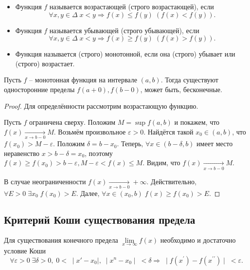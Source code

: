 \begin{itemize}
\item Функция $f$ называется возрастающей (строго возрастающей), если
$$\forall x, y \in \Delta \; x < y \Rightarrow f(x) \leq f(y) \; \left(f(x) < f(y)\right).$$
\item Функция $f$ называется убывающей (строго убывающей), если
$$\forall x, y \in \Delta \; x < y \Rightarrow f(x) \geq f(y) \; \left(f(x) > f(y)\right).$$
\item Функция называется (строго) монотонной, если она (строго) убывает или (строго) возрастает.
\end{itemize}
\begin{Theorem}
Пусть $f$ -- монотонная функция на интервале $(a, b)$.
Тогда существуют односторонние пределы $f(a+0), f(b-0)$, может быть, бесконечные.
\end{Theorem}
\begin{proof}
Для определённости рассмотрим возрастающую функцию.

Пусть $f$ ограничена сверху. Положим $M = \sup f(a, b)$ и покажем, что $f(x) \xrightarrow[x \rightarrow b-0]{} M$. Возьмём произвольное $\varepsilon > 0$. Найдётся такой $x_0 \in (a, b)$, что $f(x_0) > M - \varepsilon$.
Положим $\delta = b - x_0$. Теперь, $\forall x \in (b - \delta, b)$ имеет место неравенство $x > b - \delta = x_0$, поэтому $f(x) \geq f(x_0) > b - \varepsilon, M - \varepsilon < f(x) \leq M$. Видим, что $f(x) \xrightarrow[x \rightarrow b - 0]{} M$.

В случае неограниченности $f(x) \xrightarrow[x \rightarrow b - 0]{} +\infty$.
Действительно, $\forall E > 0 \; \exists x_0 \; f(x_0) > E$. Далее, $\forall x \in (x_0, b) \; f(x) \geq f(x_0) > E$.
\end{proof}

\subsection{Критерий Коши существования предела}
\begin{Theorem}
Для существования конечного предела $\lim\limits_{x \to \infty} f(x)$ необходимо и достаточно условие Коши
$$\forall \varepsilon > 0 \; \exists \delta > 0, \; 0 < \; \mid x' - x_0 \mid, \; \mid x^n - x_0 \mid \; < \delta \Rightarrow \; \mid f(x^\prime) - f(x^{\prime\prime}) \mid \; < \varepsilon.$$
\end{Theorem}


